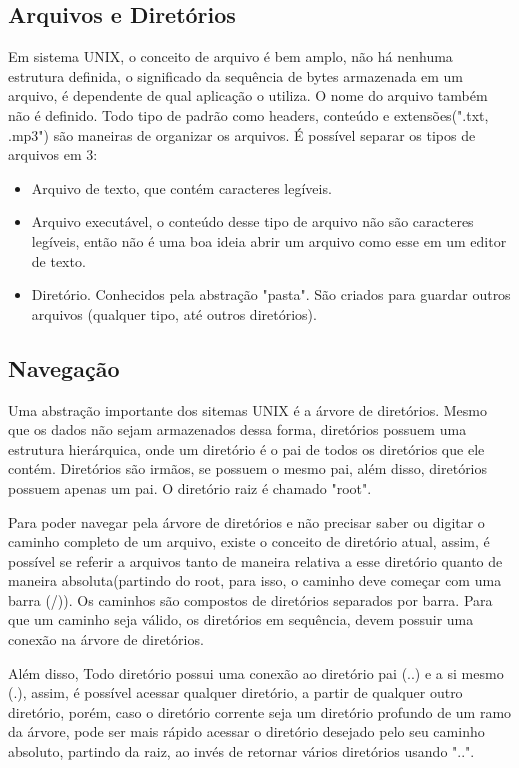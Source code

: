 \documentclass[oneside, 11 pt]{article}
\begin{document}
	\subsection{Arquivos e Diretórios}
	Em sistema UNIX, o conceito de arquivo é bem amplo, não há nenhuma estrutura definida, o significado da sequência de bytes armazenada em um arquivo, é dependente de qual aplicação o utiliza. O nome do arquivo também não é definido. Todo tipo de padrão como headers, conteúdo e extensões(".txt, .mp3") são maneiras de organizar os arquivos. É possível separar os tipos de arquivos em 3:
	\begin{itemize}
		\item Arquivo de texto, que contém caracteres legíveis.
		\item Arquivo executável, o conteúdo desse tipo de arquivo não são caracteres legíveis, então não é uma boa ideia abrir um arquivo como esse em um editor de texto.
		\item Diretório. Conhecidos pela abstração "pasta". São criados para guardar outros arquivos (qualquer tipo, até outros diretórios).
	\end{itemize}
	\subsection{Navegação}
	Uma abstração importante dos sitemas UNIX é a árvore de diretórios. Mesmo que os dados não sejam armazenados dessa forma, diretórios possuem uma estrutura hierárquica, onde um diretório é o pai de todos os diretórios que ele contém. Diretórios são irmãos, se possuem o mesmo pai, além disso, diretórios possuem apenas um pai. O diretório raiz é chamado "root".
	
	Para poder navegar pela árvore de diretórios e não precisar saber ou digitar o caminho completo de um arquivo, existe o conceito de diretório atual, assim, é possível se referir a arquivos tanto de maneira relativa a esse diretório quanto de maneira absoluta(partindo do root, para isso, o caminho deve começar com uma barra (/)). Os caminhos são compostos de diretórios separados por barra. Para que um caminho seja válido, os diretórios em sequência, devem possuir uma conexão na árvore de diretórios.
	
	Além disso, Todo diretório possui uma conexão ao diretório pai (..) e a si mesmo (.), assim, é possível acessar qualquer diretório, a partir de qualquer outro diretório, porém, caso o diretório corrente seja um diretório profundo de um ramo da árvore, pode ser mais rápido acessar o diretório desejado pelo seu caminho absoluto, partindo da raiz, ao invés de retornar vários diretórios usando "..".
	
\end{document}
